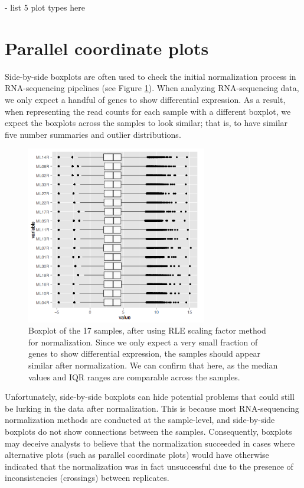 \documentclass[11pt,a4paper,oldfontcommands,openany]{memoir}
\numberwithin{equation}{section} %
\begin{document}
- list 5 plot types here

\section{Parallel coordinate plots}

Side-by-side boxplots are often used to check the initial normalization process in RNA-sequencing pipelines (see Figure \ref{fig:boxplot}). When analyzing RNA-sequencing data, we only expect a handful of genes to show differential expression. As a result, when representing the read counts for each sample with a different boxplot, we expect the boxplots across the samples to look similar; that is, to have similar five number summaries and outlier distributions.

\begin{figure}[H]
    \centering
    \includegraphics[width=0.7\textwidth]{boxplot}
    \caption{Boxplot of the 17 samples, after using RLE scaling factor method for normalization. Since we only expect a very small fraction of genes to show differential expression, the samples should appear similar after normalization. We can confirm that here, as the median values and IQR ranges are comparable across the samples.}
    \label{fig:boxplot}
\end{figure}

Unfortunately, side-by-side boxplots can hide potential problems that could still be lurking in the data after normalization. This is because most RNA-sequencing normalization methods are conducted at the sample-level, and side-by-side boxplots do not show connections between the samples. Consequently, boxplots may deceive analysts to believe that the normalization succeeded in cases where alternative plots (such as parallel coordinate plots) would have otherwise indicated that the normalization was in fact unsuccessful due to the presence of inconsistencies (crossings) between replicates.
\end{document}
